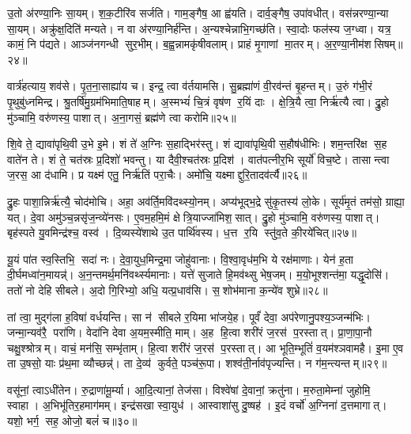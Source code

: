 उ॒तो अ॑रण्या॒निः सा॒यम्। श॒क॒टीरि॑व सर्जति। गाम॒ङ्गैष॒ आ ह्व॑यति। दार्व॒ङ्गैष॒ उपा॑वधीत्। वस॑न्नरण्या॒न्या सा॒यम्। अक्रु॑क्ष॒दिति॑ मन्यते। न वा अ॑रण्या॒निर्\mbox{}ह॑न्ति। अ॒न्यश्चेन्नाभि॒गच्छ॑ति। स्वा॒दोः फल॑स्य ज॒ग्ध्वा। यत्र॒ कामं॒ नि प॑द्यते। आञ्ज॑नगन्धी सुर॒भीम्। ब॒ह्व॒न्नामकृ॑षीवलाम्। प्राहं मृ॒गाणां मा॒तरम्। अ॒र॒ण्या॒नीम॑शसिषम्॥२४॥\anuvakamend[स्या॒म॒ रु॒रो॒ह॒ यु॒वा॒न॒श्शु॒न्ध्यूरि॒च्छमा॑नो दृश्यते॒ निप॑द्यते च॒त्वारि॑ च]

वार्त्र॑हत्याय॒ शव॑से। पृ॒त॒ना॒साह्या॑य च। इन्द्र॒ त्वा व॑र्तयामसि। सु॒ब्रह्मा॑णं वी॒रव॑न्तं बृ॒हन्तम्। उ॒रुं ग॑भी॒रं पृ॒थुबु॑ध्नमिन्द्र। श्रु॒तर्\mbox{}षि॑मु॒ग्रम॑भिमाति॒षाहम्। अ॒स्मभ्यं॑ चि॒त्रं वृष॑ण र॒यिं दाः। क्षे॒त्रि॒यै त्वा॒ निर्\mbox{}ऋ॑त्यै त्वा। द्रु॒हो मु॑ञ्चामि॒ वरु॑णस्य॒ पाशात्। अ॒ना॒गसं॒ ब्रह्म॑णे त्वा करोमि॥२५॥

शि॒वे ते॒ द्यावा॑पृथि॒वी उ॒भे इ॒मे। शं ते॑ अ॒ग्निः स॒हाद्भिर॑स्तु। शं द्यावा॑पृथि॒वी स॒हौष॑धीभिः। शम॒न्तरि॑क्ष स॒ह वाते॑न ते। शं ते॒ चत॑स्रः प्र॒दिशो॑ भवन्तु। या दैवी॒श्चत॑स्रः प्र॒दिश॑। वात॑पत्नीर॒भि सूर्यो॑ विच॒ष्टे। तासान्त्वा ज॒रस॒ आ द॑धामि। प्र यक्ष्म॑ एतु॒ निर्\mbox{}ऋ॑तिं परा॒चैः। अमो॑चि॒ यक्ष्माद्दुरि॒तादव॑र्त्यै॥२६॥

द्रु॒हः पाशा॒न्निर्\mbox{}ऋ॑त्यै॒ चोद॑मोचि। अहा॒ अव॑र्ति॒मवि॑दथ्स्यो॒नम्। अप्य॑भूद्भ॒द्रे सु॑कृ॒तस्य॑ लो॒के। सूर्य॑मृ॒तं तम॑सो॒ ग्राह्या॒ यत्। दे॒वा अमु॑ञ्च॒न्नसृ॑ज॒न्व्ये॑नसः। ए॒वम॒हमि॒मं क्षेत्रि॒याज्जा॑मिश॒सात्। द्रु॒हो मु॑ञ्चामि॒ वरु॑णस्य॒ पाशात्। बृह॑स्पते यु॒वमिन्द्र॑श्च॒ वस्व॑। दि॒व्यस्ये॑शाथे उ॒त पार्थि॑वस्य। ध॒त्त र॒यि स्तु॑व॒ते की॒रये॑चित्॥२७॥

यू॒यं पा॑त स्व॒स्तिभि॒ सदा॑ नः। दे॒वा॒युध॒मिन्द्र॒मा जोहु॑वानाः। वि॒श्वा॒वृध॑म॒भि ये रक्ष॑माणाः। येन॑ ह॒ता दी॒र्घमध्वा॑न॒मायन्न्॑। अ॒न॒न्तमर्थ॒मनि॑वर्थ्स्यमानाः। यत्ते॑ सुजाते हि॒मव॑थ्सु भेष॒जम्। म॒यो॒भूश्शन्त॑मा॒ यद्धृ॒दोसि॑। ततो॑ नो देहि सीबले। अ॒दो गि॒रिभ्यो॒ अधि॒ यत्प्र॒धाव॑सि। स॒शोभ॑माना क॒न्ये॑व शुभ्रे॥२८॥

तां त्वा॒ मुद्ग॑ला ह॒विषा॑ वर्धयन्ति। सा न॑ सीबले र॒यिमा भा॑जये॒ह। पूर्वं॑ देवा॒ अप॑रेणानु॒पश्य॒ञ्जन्म॑भिः। जन्मा॒न्यव॑रै॒ परा॑णि। वेदा॑नि देवा अ॒यम॒स्मीति॒ माम्। अ॒ह हि॒त्वा शरी॑रं ज॒रस॑ प॒रस्तात्। प्रा॒णा॒पा॒नौ चक्षु॒श्श्रोत्रम्। वाचं॒ मन॑सि॒ सम्भृ॑ताम्। हि॒त्वा शरी॑रं ज॒रस॑ प॒रस्तात्। आ भूति॒म्भूतिं॑ व॒यम॑श्ञवामहै। इ॒मा ए॒व ता उ॒षसो॒ याः प्र॑थ॒मा व्यौच्छन्न्॑। ता दे॒व्य॑ कुर्वते॒ पञ्च॑रू॒पा। शश्व॑ती॒र्नाव॑पृज्यन्ति। न ग॑म॒न्त्यन्तम्॥२९॥\anuvakamend[क॒रो॒म्यव॑र्त्यै चिच्छुभ्रेऽश्ञवामहै च॒त्वारि॑ च]

वसू॑नां॒ त्वाऽधी॑तेन। रु॒द्राणा॑मू॒र्म्या। आ॒दि॒त्यानां॒ तेज॑सा। विश्वे॑षां दे॒वानां॒ क्रतु॑ना। म॒रुता॒मेम्ना॑ जुहोमि॒ स्वाहा। अ॒भिभू॑तिर॒हमाग॑मम्। इन्द्र॑सखा स्वा॒युध॑। आस्वाशा॑सु दु॒ष्षह॑। इ॒दं वर्चो॑ अ॒ग्निना॑ द॒त्तमागात्। यशो॒ भर्ग॒ सह॒ ओजो॒ बलं॑ च॥३०॥

